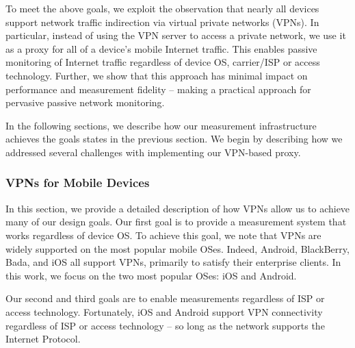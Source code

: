 
To meet the above goals, we exploit the observation that nearly all 
devices support network traffic indirection via virtual private networks (VPNs). 
In particular, instead of using the VPN server to access a private network, 
we use it as a proxy for all of a device's mobile Internet traffic. This enables passive monitoring 
of Internet traffic regardless of device OS, carrier/ISP or access technology. 
Further, we show that this approach has minimal impact on 
performance and measurement fidelity -- making \platname{} a practical 
approach for pervasive passive network monitoring.

In the following sections, we describe how our measurement infrastructure 
achieves the goals states in the previous section. We begin by describing 
how we addressed several challenges with implementing our VPN-based 
proxy. 



\subsubsection{VPNs for Mobile Devices}
\label{sec:vpn-tech-mobile-device}
In this section, we provide a detailed description of how VPNs allow 
us to achieve many of our \platname{} design goals.  
Our first goal is to provide a measurement system that works regardless 
of device OS. To achieve this goal, we note that VPNs are widely supported 
on the most popular mobile OSes. Indeed, Android, BlackBerry, Bada, and iOS all support VPNs,
primarily to satisfy their enterprise clients. In this work, we focus on 
the two most popular OSes: iOS and Android. 

Our second and third goals are 
to enable measurements regardless of ISP or access technology. 
Fortunately, iOS and Android support VPN connectivity regardless of  
ISP or access technology -- so long as the network supports the Internet Protocol. 

